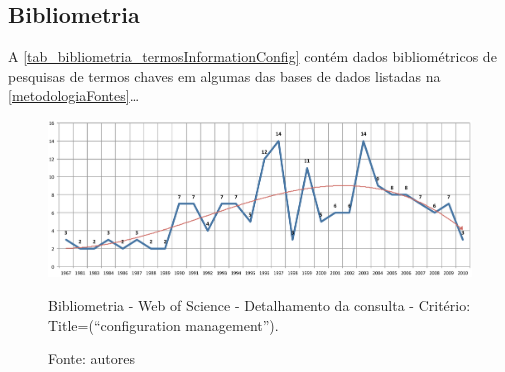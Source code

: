 \subsection{Bibliometria}\label{metodologiaBibliometria}

A \autoref{tab_bibliometria_termosInformationConfig} contém dados bibliométricos
de pesquisas de termos chaves em algumas das bases de dados listadas na
\autoref{metodologiaFontes}\ldots




\begin{figure}[htb]
\begin{center}
  \includegraphics[scale=0.55]{imagens/bibliometriaWebOfScience1.pdf}
  \caption{\label{fig_biblioWebOfScience1}Bibliometria - Web of Science -
  Detalhamento da consulta - Critério: Title=(``configuration management'').}
  \caption*{Fonte: autores}
\end{center}
\end{figure}

